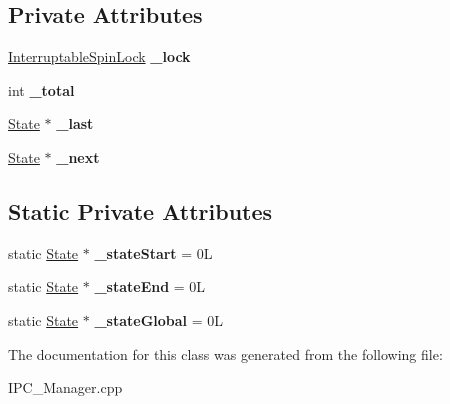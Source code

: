 \subsection*{Private Attributes}
\begin{DoxyCompactItemize}
\item 
\mbox{\label{class_i_p_c___manager___internal_1_1_state_adb166f964898d903a61faf66c0d1164f}} 
\hyperlink{class_interruptable_spin_lock}{Interruptable\+Spin\+Lock} {\bfseries \+\_\+lock}
\item 
\mbox{\label{class_i_p_c___manager___internal_1_1_state_a65a4339c6058a25c7d1f40510f486e6e}} 
int {\bfseries \+\_\+total}
\item 
\mbox{\label{class_i_p_c___manager___internal_1_1_state_af5cb034722c792db79cb486da063cf63}} 
\hyperlink{class_i_p_c___manager___internal_1_1_state}{State} $\ast$ {\bfseries \+\_\+last}
\item 
\mbox{\label{class_i_p_c___manager___internal_1_1_state_ab60d6c739e1ca2bd7257d70a82bf173a}} 
\hyperlink{class_i_p_c___manager___internal_1_1_state}{State} $\ast$ {\bfseries \+\_\+next}
\end{DoxyCompactItemize}
\subsection*{Static Private Attributes}
\begin{DoxyCompactItemize}
\item 
\mbox{\label{class_i_p_c___manager___internal_1_1_state_a3067365fbd6ac2fcb1d171d2cc74056f}} 
static \hyperlink{class_i_p_c___manager___internal_1_1_state}{State} $\ast$ {\bfseries \+\_\+state\+Start} = 0L
\item 
\mbox{\label{class_i_p_c___manager___internal_1_1_state_a39c2c260e6dded8dc72c807b579f5039}} 
static \hyperlink{class_i_p_c___manager___internal_1_1_state}{State} $\ast$ {\bfseries \+\_\+state\+End} = 0L
\item 
\mbox{\label{class_i_p_c___manager___internal_1_1_state_ab1eca1945371e3e8aee1f37830ccd160}} 
static \hyperlink{class_i_p_c___manager___internal_1_1_state}{State} $\ast$ {\bfseries \+\_\+state\+Global} = 0L
\end{DoxyCompactItemize}


The documentation for this class was generated from the following file\+:\begin{DoxyCompactItemize}
\item 
I\+P\+C\+\_\+\+Manager.\+cpp\end{DoxyCompactItemize}
